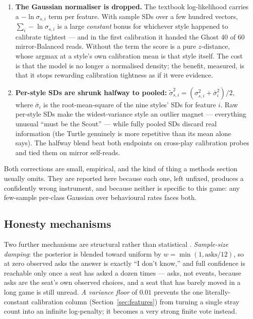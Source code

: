 \documentclass[11pt]{article}
\begin{document}
\begin{enumerate}
\item \textbf{The Gaussian normaliser is dropped.} The textbook log-likelihood carries a
  $-\ln\sigma_{s,i}$ term per feature. With sample SDs over a few hundred vectors,
  $\sum_i -\ln\sigma_{s,i}$ is a large \emph{constant} bonus for whichever style happened to
  calibrate tightest --- and in the first calibration it handed the Ghost 40 of 60
  mirror-Balanced reads. Without the term the score is a pure $z$-distance, whose argmax at a
  style's own calibration mean is that style itself. The cost is that the model is no longer
  a normalised density; the benefit, measured, is that it stops rewarding calibration
  tightness as if it were evidence.
\item \textbf{Per-style SDs are shrunk halfway to pooled:}
  $\tilde\sigma_{s,i}^2 = (\sigma_{s,i}^2 + \bar\sigma_i^2)/2$, where $\bar\sigma_i$ is the
  root-mean-square of the nine styles' SDs for feature $i$. Raw per-style SDs make the
  widest-variance style an outlier magnet --- everything unusual ``must be the Scout'' ---
  while fully pooled SDs discard real information (the Turtle genuinely is more repetitive
  than its mean alone says). The halfway blend beat both endpoints on cross-play calibration
  probes and tied them on mirror self-reads.
\end{enumerate}

Both corrections are small, empirical, and the kind of thing a methods section usually omits.
They are reported here because each one, left unfixed, produces a confidently wrong
instrument, and because neither is specific to this game: any few-sample per-class Gaussian
over behavioural rates faces both.

\subsection{Honesty mechanisms}

Two further mechanisms are structural rather than statistical \cite{repo}. \emph{Sample-size
damping}: the posterior is blended toward uniform by $w = \min(1, \mathrm{asks}/12)$, so at
zero observed asks the answer is exactly ``I don't know,'' and full confidence is reachable
only once a seat has asked a dozen times --- asks, not events, because asks are the seat's
own observed choices, and a seat that has barely moved in a long game is still unread.
\emph{A variance floor} of $0.01$ prevents the one literally-constant calibration column
(Section~\ref{sec:features}) from turning a single stray count into an infinite log-penalty;
it becomes a very strong finite vote instead.
\end{document}
